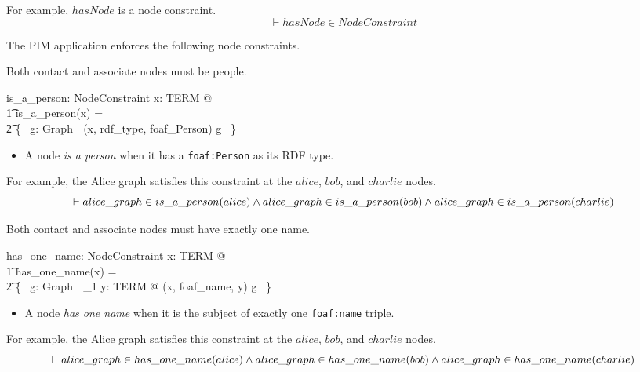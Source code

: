 \documentclass{article}
\begin{document}
For example, $hasNode$ is a node constraint.
\[\vdash
	hasNode \in NodeConstraint
\]

The PIM application enforces the following node constraints.

Both contact and associate nodes must be people.
\begin{axdef}
	is\_a\_person: NodeConstraint
\where
	\forall x: TERM @ \\
\t1		is\_a\_person(x) = \\
\t2		\{~ g: Graph | (x, rdf\_type, foaf\_Person) \in g ~\}
\end{axdef}
\begin{itemize}
\item A node {\em is a person} when it has a {\tt foaf:Person} as its RDF type.
\end{itemize}

For example, the Alice graph satisfies this constraint at the $alice$, $bob$, and $charlie$ nodes.
\[\vdash
	alice\_graph \in is\_a\_person(alice) \land \\
	alice\_graph \in is\_a\_person(bob) \land \\
	alice\_graph \in is\_a\_person(charlie)
\]

\cbstart
Both contact and associate nodes must have exactly one name.
\cbend
\begin{axdef}
	has\_one\_name: NodeConstraint
\where
	\forall x: TERM @ \\
\t1		has\_one\_name(x) = \\
\t2			\{~ g: Graph | \exists_1 y: TERM @ (x, foaf\_name, y) \in g ~\}
\end{axdef}
\begin{itemize}
\item A node {\em has one name} when it is the subject of exactly one {\tt foaf:name} triple.
\end{itemize}

For example, the Alice graph satisfies this constraint at the $alice$, $bob$, and $charlie$ nodes.
\[\vdash
	alice\_graph \in has\_one\_name(alice) \land \\
	alice\_graph \in has\_one\_name(bob) \land \\
	alice\_graph \in has\_one\_name(charlie)
\]
\end{document}
